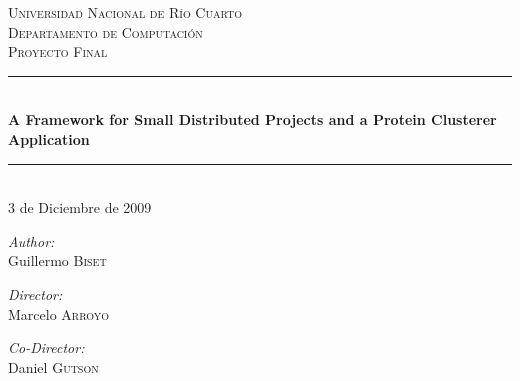 \documentclass[a4paper,12pt,english]{report}
\newcommand{\HRule}{\rule{\linewidth}{0.5mm}}
\begin{document}


\begin{titlepage}
 
\begin{center}

 
\textsc{\large Universidad Nacional de R\'io Cuarto \\ \normalsize Departamento de Computaci\'on}\\[2.9cm]
 
\textsc{\normalsize Proyecto Final}\\[0.2cm]
 
\HRule \\[0.4cm]
{ \Large \bfseries A Framework for Small Distributed Projects and a Protein Clusterer Application}\\[0.1cm]
\HRule 
\\[0.6cm]
{\normalsize 3 de Diciembre de 2009}
\vfill
\begin{minipage}{0.25\textwidth}
\begin{flushleft} \large
\emph{Author:}\\
Guillermo \textsc{Biset}
\end{flushleft}
\end{minipage}
\begin{minipage}{0.25\textwidth}
\begin{center} \large
\emph{Director:} \\
Marcelo \textsc{Arroyo}
\end{center}
\end{minipage}
\begin{minipage}{0.25\textwidth}
\begin{flushright} \large
\emph{Co-Director:} \\
Daniel \textsc{Gutson}
\end{flushright}
\end{minipage}
 
\end{center}
 
\end{titlepage}

\newpage
\end{document}
